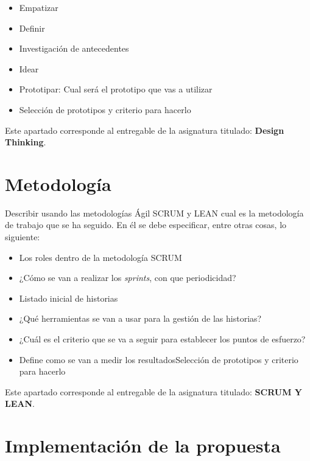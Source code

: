 \documentclass[12pt,a4paper]{proyectoinnovacion}
\begin{document}
\begin{itemize}
  \item Empatizar
  \item Definir
  \item Investigación de antecedentes
  \item Idear
  \item Prototipar: Cual será el prototipo que vas a utilizar
  \item Selección de prototipos y criterio para hacerlo  
\end{itemize}


\begin{quotebox}
  Este apartado corresponde al entregable de la asignatura titulado: \textbf{Design Thinking}.
\end{quotebox}


\section{Metodología}

Describir usando las metodologías Ágil SCRUM y LEAN cual es la metodología de trabajo que se ha seguido. En él se debe especificar, entre otras cosas, lo siguiente:

\begin{itemize}
  \item Los roles dentro de la metodología SCRUM
  \item ¿Cómo se van a realizar los \textit{sprints}, con que periodicidad?
  \item Listado inicial de historias
  \item ¿Qué herramientas se van a usar para la gestión de las historias?
  \item ¿Cuál es el criterio que se va a seguir para establecer los puntos de esfuerzo?
  \item Define como se van a medir los resultadosSelección de prototipos y criterio para hacerlo  
\end{itemize}

\begin{quotebox}
  Este apartado corresponde al entregable de la asignatura titulado: \textbf{SCRUM Y LEAN}.
\end{quotebox}

\section{Implementación de la propuesta}
\end{document}
